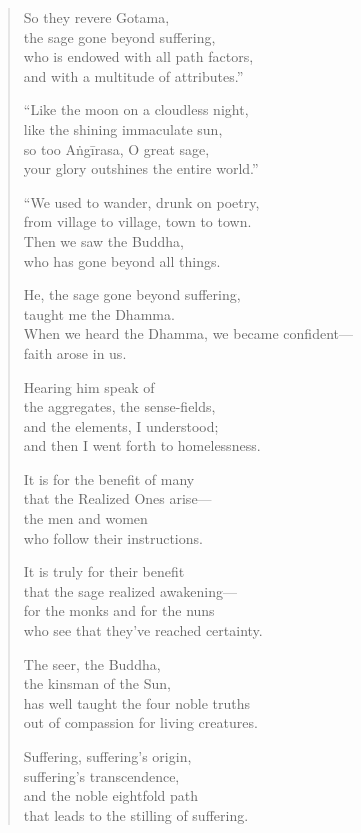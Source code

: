 \documentclass[12pt,openany]{book}%
\begin{document}
\begin{verse}
So they revere Gotama, \\
the sage gone beyond suffering, \\
who is endowed with all path factors, \\
and with a multitude of attributes.” 

“Like the moon on a cloudless night, \\
like the shining immaculate sun, \\
so too \textsanskrit{Aṅgīrasa}, O great sage, \\
your glory outshines the entire world.” 

“We used to wander, drunk on poetry, \\
from village to village, town to town. \\
Then we saw the Buddha, \\
who has gone beyond all things. 

He, the sage gone beyond suffering, \\
taught me the Dhamma. \\
When we heard the Dhamma, we became confident—\\
faith arose in us. 

Hearing him speak of \\
the aggregates, the sense-fields, \\
and the elements, I understood; \\
and then I went forth to homelessness. 

It is for the benefit of many \\
that the Realized Ones arise—\\
the men and women \\
who follow their instructions. 

It is truly for their benefit \\
that the sage realized awakening—\\
for the monks and for the nuns \\
who see that they’ve reached certainty. 

The seer, the Buddha, \\
the kinsman of the Sun, \\
has well taught the four noble truths \\
out of compassion for living creatures. 

Suffering, suffering’s origin, \\
suffering’s transcendence, \\
and the noble eightfold path \\
that leads to the stilling of suffering. 


\end{verse}
\end{document}
